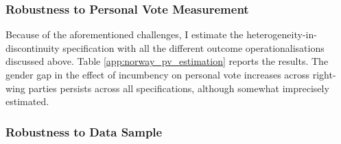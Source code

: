 \documentclass[12pt]{article}
\begin{document}


\clearpage
\subsubsection{Robustness to Personal Vote Measurement}

Because of the aforementioned challenges, I estimate the heterogeneity-in-discontinuity specification with all the different outcome operationalisations discussed above. Table \ref{app:norway_pv_estimation} reports the results. The gender gap in the effect of incumbency on personal vote increases across right-wing parties persists across all specifications, although somewhat imprecisely estimated.



\clearpage
\subsubsection{Robustness to Data Sample}
\label{app:norway_pv_data}
\end{document}
